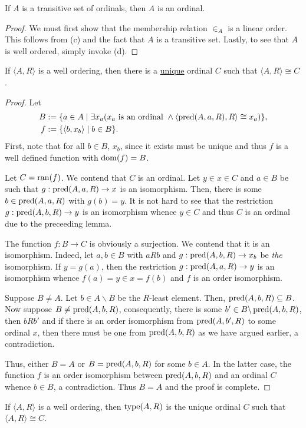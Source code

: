 \begin{lemma}
    If $A$ is a transitive set of ordinals, then $A$ is an ordinal.
\end{lemma}
\begin{proof}
    We must first show that the membership relation $\in_A$ is a linear order. This follows from  (c) and the fact that $A$ is a transitive set. Lastly, to see that $A$ is well ordered, simply invoke  (d).
\end{proof}

\begin{theorem}
    If $\langle A, R\rangle$ is a well ordering, then there is a \underline{unique} ordinal $C$ such that $\langle A, R\rangle\cong C$.
\end{theorem}
\begin{proof}
    Let 
    \begin{align*}
        B &:= \{a\in A\mid\exists x_a(x_a\text{ is an ordinal }\wedge\langle\operatorname{pred}(A,a,R), R\rangle\cong x_a)\},\\
        f &:= \{\langle b, x_b\rangle\mid b\in B\}.
    \end{align*}
    First, note that for all $b\in B$, $x_b$, since it exists must be unique and thus $f$ is a well defined function with $\operatorname{dom}(f) = B$.

    Let $C = \operatorname{ran}(f)$. We contend that $C$ is an ordinal. Let $y\in x\in C$ and $a\in B$ be such that $g:\operatorname{pred}(A,a,R)\to x$ is an isomorphism. Then, there is some $b\in\operatorname{pred}(A,a,R)$ with $g(b) = y$. It is not hard to see that the restriction $g:\operatorname{pred}(A,b,R)\to y$ is an isomorphism whence $y\in C$ and thus $C$ is an ordinal due to the preceeding lemma.

    The function $f: B\to C$ is obviously a surjection. We contend that it is an isomorphism. Indeed, let $a,b\in B$ with $a R b$ and $g: \operatorname{pred}(A,b,R)\to x_b$ be \emph{the} isomorphism. If $y = g(a)$, then the restriction $g:\operatorname{pred}(A,a,R)\to y$ is an isomorphism whence $f(a) = y\in x = f(b)$ and $f$ is an order isomorphism.

    Suppose $B\ne A$. Let $b\in A\backslash B$ be the $R$-least element. Then, $\operatorname{pred}(A,b,R)\subseteq B$. Now suppose $B\ne\operatorname{pred}(A,b,R)$, consequently, there is some $b'\in B\backslash\operatorname{pred}(A,b,R)$, then $bRb'$ and if there is an order isomorphism from $\operatorname{pred}(A,b',R)$ to some ordinal $x$, then there must be one from $\operatorname{pred}(A,b,R)$ as we have argued earlier, a contradiction. 
    
    Thus, either $B = A$ or $B = \operatorname{pred}(A,b,R)$ for some $b\in A$. In the latter case, the function $f$ is an order isomorphism between $\operatorname{pred}(A,b,R)$ and an ordinal $C$ whence $b\in B$, a contradiction. Thus $B = A$ and the proof is complete.
\end{proof}

\begin{definition}
    If $\langle A, R\rangle$ is a well ordering, then $\operatorname{type}(A,R)$ is the unique ordinal $C$ such that $\langle A, R\rangle\cong C$.
\end{definition}
